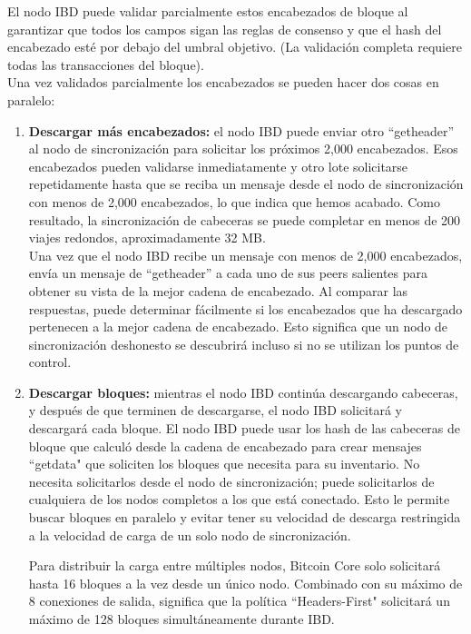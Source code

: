 \documentclass[11pt,a4paper]{article}
\begin{document}
El nodo IBD puede validar parcialmente estos encabezados de bloque al garantizar que todos los campos sigan las reglas de consenso y que el hash del encabezado esté por debajo del umbral objetivo. (La validación completa requiere todas las transacciones del bloque).\\

Una vez validados parcialmente los encabezados se pueden hacer dos cosas en paralelo:

\begin{enumerate}
	\item \textbf{Descargar más encabezados:} el nodo IBD puede enviar otro ``getheader'' al nodo de sincronización para solicitar los próximos 2,000 encabezados. Esos encabezados pueden validarse inmediatamente y otro lote solicitarse repetidamente hasta que se reciba un mensaje desde el nodo de sincronización con menos de 2,000 encabezados, lo que indica que hemos acabado. Como resultado, la sincronización de cabeceras se puede completar en menos de 200 viajes redondos, aproximadamente 32 MB.\\

Una vez que el nodo IBD recibe un mensaje con menos de 2,000 encabezados, envía un mensaje de ``getheader'' a cada uno de sus peers salientes para obtener su vista de la mejor cadena de encabezado. Al comparar las respuestas, puede determinar fácilmente si los encabezados que ha descargado pertenecen a la mejor cadena de encabezado. Esto significa que un nodo de sincronización deshonesto se descubrirá incluso si no se utilizan los puntos de control.

	\item \textbf{Descargar bloques:} mientras el nodo IBD continúa descargando cabeceras, y después de que terminen de descargarse, el nodo IBD solicitará y descargará cada bloque. El nodo IBD puede usar los hash de las cabeceras de bloque que calculó desde la cadena de encabezado para crear mensajes ``getdata" que soliciten los bloques que necesita para su inventario. No necesita solicitarlos desde el nodo de sincronización; puede solicitarlos de cualquiera de los nodos completos a los que está conectado. Esto le permite buscar bloques en paralelo y evitar tener su velocidad de descarga restringida a la velocidad de carga de un solo nodo de sincronización.

Para distribuir la carga entre múltiples nodos, Bitcoin Core solo solicitará hasta 16 bloques a la vez desde un único nodo. Combinado con su máximo de 8 conexiones de salida, significa que la política ``Headers-First" solicitará un máximo de 128 bloques simultáneamente durante IBD.
\end{enumerate}
\end{document}
